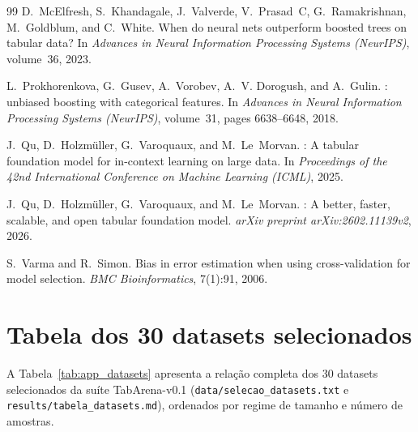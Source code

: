 \documentclass[11pt,a4paper]{article}
\begin{document}
\begin{thebibliography}{99}
D.~McElfresh, S.~Khandagale, J.~Valverde, V.~Prasad~C, G.~Ramakrishnan, M.~Goldblum, and C.~White.
\newblock When do neural nets outperform boosted trees on tabular data?
\newblock In \emph{Advances in Neural Information Processing Systems (NeurIPS)}, volume~36, 2023.

L.~Prokhorenkova, G.~Gusev, A.~Vorobev, A.~V. Dorogush, and A.~Gulin.
: unbiased boosting with categorical features.
\newblock In \emph{Advances in Neural Information Processing Systems (NeurIPS)}, volume~31, pages 6638--6648, 2018.

J.~Qu, D.~Holzm\"{u}ller, G.~Varoquaux, and M.~Le~Morvan.
: A tabular foundation model for in-context learning on large data.
\newblock In \emph{Proceedings of the 42nd International Conference on Machine Learning (ICML)}, 2025.

J.~Qu, D.~Holzm\"{u}ller, G.~Varoquaux, and M.~Le~Morvan.
: A better, faster, scalable, and open tabular foundation model.
\newblock \emph{arXiv preprint arXiv:2602.11139v2}, 2026.

S.~Varma and R.~Simon.
\newblock Bias in error estimation when using cross-validation for model selection.
\newblock \emph{BMC Bioinformatics}, 7(1):91, 2006.

\end{thebibliography}

\newpage
\appendix

\section{Tabela dos 30 datasets selecionados}
\label{app:datasets}

A Tabela~\ref{tab:app_datasets} apresenta a relação completa dos 30 datasets selecionados da suíte TabArena-v0.1 (\texttt{data/selecao\_datasets.txt} e \texttt{results/tabela\_datasets.md}), ordenados por regime de tamanho e número de amostras.
\end{document}
